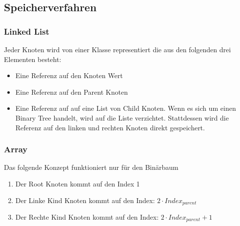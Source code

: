 \subsection{Speicherverfahren}
\subsubsection{Linked List}
Jeder Knoten wird von einer Klasse representiert die aus den folgenden drei Elementen besteht:
\begin{itemize}
	\item Eine Referenz auf den Knoten Wert
	\item Eine Referenz auf den Parent Knoten
	\item Eine Referenz auf auf eine List von Child Knoten. Wenn es sich um einen Binary Tree handelt, wird auf die Liste verzichtet. Stattdessen wird die Referenz auf den linken und rechten Knoten direkt gespeichert.
\end{itemize}

\subsubsection{Array}
Das folgende Konzept funktioniert nur für den Binärbaum
\begin{enumerate}
	\item Der Root Knoten kommt auf den Index 1
	\item Der Linke Kind Knoten kommt auf den Index: $2 \cdot Index_{parent}$
	\item Der Rechte Kind Knoten kommt auf den Index: $2 \cdot Index_{parent} + 1$
\end{enumerate}

